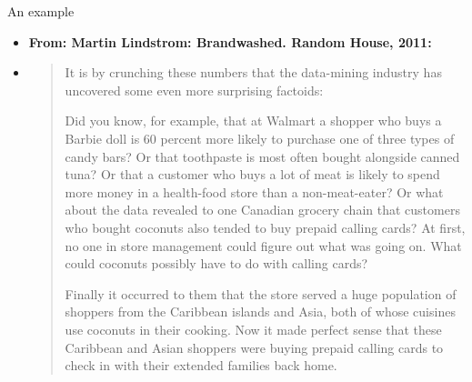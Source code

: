 \documentclass[aspectratio=169,t,xcolor=dvipsnames]{beamer}
\begin{document}
  {
    \begin{frame}{An example}
        \begin{itemize}
            \item \textbf{From: Martin Lindstrom: Brandwashed. Random House, 2011:}
            \item \begin{quote}
            It is by crunching these numbers that the data-mining industry has uncovered some even more surprising factoids:

            Did you know, for example, that at Walmart a shopper who buys a Barbie doll is 60 percent more likely to purchase one of three types of candy bars? Or that toothpaste is most often bought alongside canned tuna? Or that a customer who buys a lot of meat is likely to spend more money in a health-food store than a non-meat-eater? Or what about the data revealed to one Canadian grocery chain that customers who bought coconuts also tended to buy prepaid calling cards? At first, no one in store management could figure out what was going on. What could coconuts possibly have to do with calling cards?

            Finally it occurred to them that the store served a huge population of shoppers from the Caribbean islands and Asia, both of whose cuisines use coconuts in their cooking. Now it made perfect sense that these Caribbean and Asian shoppers were buying prepaid calling cards to check in with their extended families back home.
            \end{quote}
        \end{itemize}
    \end{frame}
  }
\end{document}
